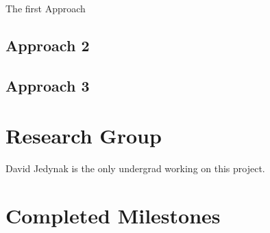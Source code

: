 \documentclass{article}
\begin{document}
The first Approach 

\subsection{Approach 2}


\subsection{Approach 3}



\section{Research Group}
David Jedynak is the only undergrad working on this project.
\section{Completed Milestones}
\end{document}
